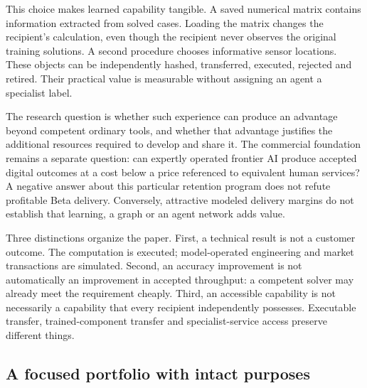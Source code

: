\documentclass[11pt,letterpaper]{article}
\begin{document}
This choice makes learned capability tangible. A saved numerical matrix contains information extracted from solved cases. Loading the matrix changes the recipient's calculation, even though the recipient never observes the original training solutions. A second procedure chooses informative sensor locations. These objects can be independently hashed, transferred, executed, rejected and retired. Their practical value is measurable without assigning an agent a specialist label.

The research question is whether such experience can produce an advantage beyond competent ordinary tools, and whether that advantage justifies the additional resources required to develop and share it. The commercial foundation remains a separate question: can expertly operated frontier AI produce accepted digital outcomes at a cost below a price referenced to equivalent human services? A negative answer about this particular retention program does not refute profitable Beta delivery. Conversely, attractive modeled delivery margins do not establish that learning, a graph or an agent network adds value.

Three distinctions organize the paper. First, a technical result is not a customer outcome. The computation is executed; model-operated engineering and market transactions are simulated. Second, an accuracy improvement is not automatically an improvement in accepted throughput: a competent solver may already meet the requirement cheaply. Third, an accessible capability is not necessarily a capability that every recipient independently possesses. Executable transfer, trained-component transfer and specialist-service access preserve different things.

\subsection{A focused portfolio with intact purposes}
\end{document}
